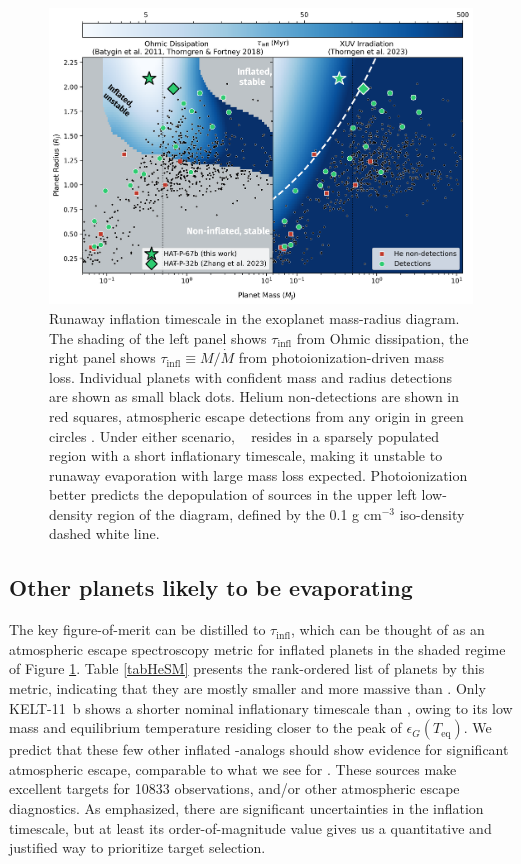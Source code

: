 \documentclass[twocolumn]{aastex631}
\newcommand{\hatpb}{\object{HAT-P-67 b}}
\begin{document}
\begin{figure}[t]
    \includegraphics[width=\linewidth]{figures/thorn2023_theory.png}
    \caption{Runaway inflation timescale in the exoplanet mass-radius diagram.  The shading of the left panel shows $\tau_\mathrm{infl}$ from Ohmic dissipation, the right panel shows $\tau_\mathrm{infl}\equiv M/\dot{M}$ from photoionization-driven mass loss.  Individual planets with confident mass and radius detections are shown as small black dots. Helium non-detections are shown in red squares, atmospheric escape detections from any origin in green circles \citep{2022arXiv221116243D}.  Under either scenario, \hatpb~ resides in a sparsely populated region with a short inflationary timescale, making it unstable to runaway evaporation with large mass loss expected.  Photoionization better predicts the depopulation of sources in the upper left low-density region of the diagram, defined by the 0.1 g cm$^{-3}$ iso-density dashed white line.}
    \label{fig:tf2018_theory}
\end{figure}


\subsection{Other planets likely to be evaporating}

The key figure-of-merit can be distilled to $\tau_\mathrm{infl}$, which can be thought of as an atmospheric escape spectroscopy metric \citep{2018PASP..130k4401K} for inflated planets in the shaded regime of Figure \ref{fig:tf2018_theory}.  Table \ref{tabHeSM} presents the rank-ordered list of planets by this metric, indicating that they are mostly smaller and more massive than \hatpb.  Only KELT-11~b shows a shorter nominal inflationary timescale than \hatpb, owing to its low mass and equilibrium temperature residing closer to the peak of $\epsilon_G(T_\mathrm{eq})$.  We predict that these few other inflated \hatpb-analogs should show evidence for significant atmospheric escape, comparable to what we see for \hatpb.  These sources make excellent targets for  10833 observations, and/or other atmospheric escape diagnostics.  As emphasized, there are significant uncertainties in the inflation timescale, but at least its order-of-magnitude value gives us a quantitative and justified way to prioritize target selection.
\end{document}
